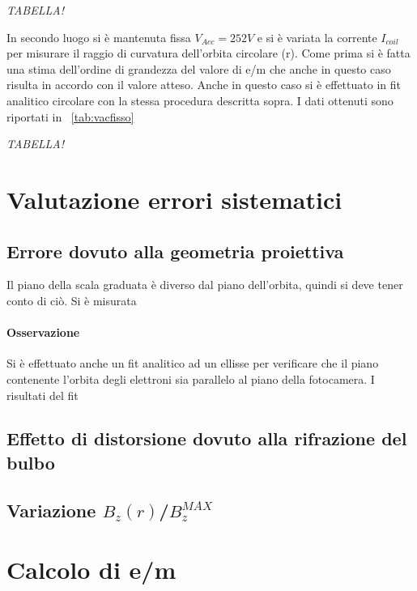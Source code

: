 \documentclass[10pt,a4paper]{article}
\begin{document}
\emph{TABELLA!}

In secondo luogo si è mantenuta fissa $V_{Acc} = \unit{252}{V}$ e si è variata la corrente $I_{coil}$ per misurare il raggio di curvatura dell'orbita circolare (r). Come prima si è fatta una stima dell'ordine di grandezza del valore di e/m che anche in questo caso risulta in accordo con il valore atteso.
Anche in questo caso si è effettuato in fit analitico circolare con la stessa procedura descritta sopra. I dati ottenuti sono riportati in \tablename{~\ref{tab:vacfisso}}

\emph{TABELLA!}
\section{Valutazione errori sistematici}

\subsection{Errore dovuto alla geometria proiettiva}
Il piano della scala graduata è diverso dal piano dell'orbita, quindi si deve tener conto di ciò. Si è misurata 

\paragraph{Osservazione}
Si è effettuato anche un fit analitico ad un ellisse per verificare che il piano contenente l'orbita degli elettroni sia parallelo al piano della fotocamera. I risultati del fit 

\subsection{Effetto di distorsione dovuto alla rifrazione del bulbo}

\subsection{Variazione $B_z(r)$/$B_z^{MAX}$}

\section{Calcolo di e/m}


\end{document}
